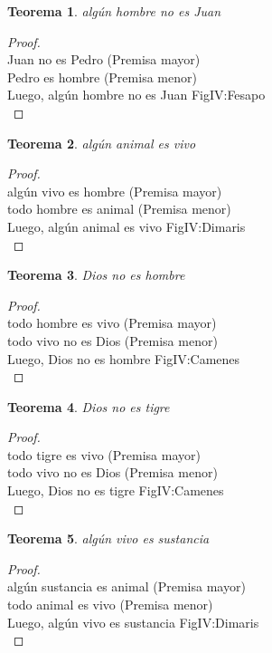 ﻿\documentclass[12pt]{book}
\newtheorem{theorem}{Teorema}[chapter]
\newtheorem{proof}{Demostración}
\begin{document}
\begin{theorem}
algún hombre no es Juan
\label{th: 84}
\end{theorem}\begin{proof}\\Juan no es Pedro	 (Premisa mayor) \\Pedro es hombre	 (Premisa menor) \\Luego, algún hombre no es Juan	FigIV:Fesapo \\ \end{proof}
\begin{theorem}
algún animal es vivo
\label{th: 85}
\end{theorem}\begin{proof}\\algún vivo es hombre	 (Premisa mayor) \\todo hombre es animal	 (Premisa menor) \\Luego, algún animal es vivo	FigIV:Dimaris \\ \end{proof}
\begin{theorem}
Dios no es hombre
\label{th: 86}
\end{theorem}\begin{proof}\\todo hombre es vivo	 (Premisa mayor) \\todo vivo no es Dios	 (Premisa menor) \\Luego, Dios no es hombre	FigIV:Camenes \\ \end{proof}
\begin{theorem}
Dios no es tigre
\label{th: 87}
\end{theorem}\begin{proof}\\todo tigre es vivo	 (Premisa mayor) \\todo vivo no es Dios	 (Premisa menor) \\Luego, Dios no es tigre	FigIV:Camenes \\ \end{proof}
\begin{theorem}
algún vivo es sustancia
\label{th: 88}
\end{theorem}\begin{proof}\\algún sustancia es animal	 (Premisa mayor) \\todo animal es vivo	 (Premisa menor) \\Luego, algún vivo es sustancia	FigIV:Dimaris \\ \end{proof}
\end{document}
